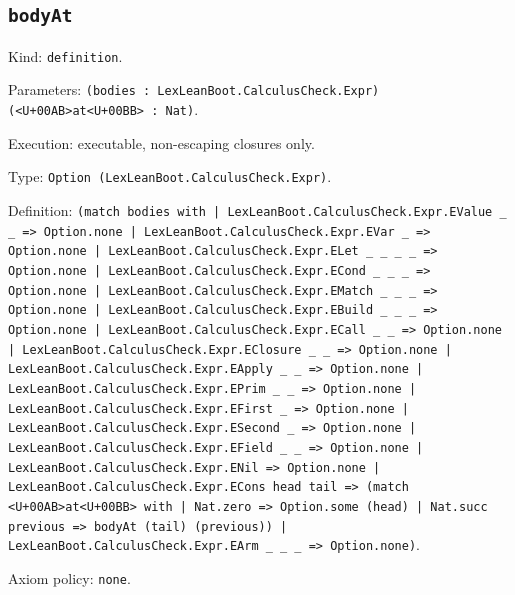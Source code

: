 \documentclass[11pt]{article}
\begin{document}
\subsection*{\texttt{bodyAt}}
\noindent Kind: \texttt{definition}.\par
\noindent Parameters: \texttt{(bodies : LexLeanBoot.CalculusCheck.Expr) (<U+00AB>at<U+00BB> : Nat)}.\par
\noindent Execution: executable, non-escaping closures only.\par
\noindent Type: \texttt{Option (LexLeanBoot.CalculusCheck.Expr)}.\par
\noindent Definition: \texttt{(match bodies with | LexLeanBoot.CalculusCheck.Expr.EValue \_ \_ => Option.none | LexLeanBoot.CalculusCheck.Expr.EVar \_ => Option.none | LexLeanBoot.CalculusCheck.Expr.ELet \_ \_ \_ \_ => Option.none | LexLeanBoot.CalculusCheck.Expr.ECond \_ \_ \_ => Option.none | LexLeanBoot.CalculusCheck.Expr.EMatch \_ \_ \_ => Option.none | LexLeanBoot.CalculusCheck.Expr.EBuild \_ \_ \_ => Option.none | LexLeanBoot.CalculusCheck.Expr.ECall \_ \_ => Option.none | LexLeanBoot.CalculusCheck.Expr.EClosure \_ \_ => Option.none | LexLeanBoot.CalculusCheck.Expr.EApply \_ \_ => Option.none | LexLeanBoot.CalculusCheck.Expr.EPrim \_ \_ => Option.none | LexLeanBoot.CalculusCheck.Expr.EFirst \_ => Option.none | LexLeanBoot.CalculusCheck.Expr.ESecond \_ => Option.none | LexLeanBoot.CalculusCheck.Expr.EField \_ \_ => Option.none | LexLeanBoot.CalculusCheck.Expr.ENil => Option.none | LexLeanBoot.CalculusCheck.Expr.ECons head tail => (match <U+00AB>at<U+00BB> with | Nat.zero => Option.some (head) | Nat.succ previous => bodyAt (tail) (previous)) | LexLeanBoot.CalculusCheck.Expr.EArm \_ \_ \_ => Option.none)}.\par
\noindent Axiom policy: \texttt{none}.\par
\end{document}
